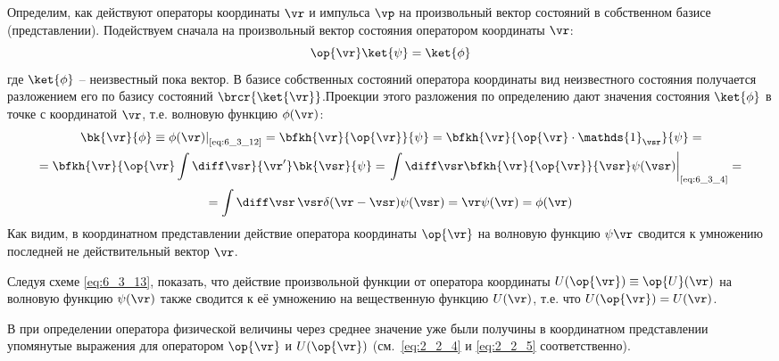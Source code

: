 Определим, как действуют операторы координаты $\vr$ и импульса $\vp$ на произвольный вектор состояний в собственном базисе (представлении). Подействуем сначала на произвольный вектор состояния оператором координаты $\vr$:%
%
\begin{equation}
\label{eq:6_3_12}
\op{\vr} \ket{\psi} = \ket{\phi}
\end{equation}%
%
где $\ket{\phi}$ -- неизвестный пока вектор. В базисе собственных состояний оператора координаты вид неизвестного состояния получается разложением его по базису состояний $\brcr{\ket{\vr}}$.Проекции этого разложения по определению дают значения состояния $\ket{\phi}$ в точке с координатой $\vr$, т.е. волновую функцию $\phi(\vr)$:%
%
\begin{equation}
\label{eq:6_3_13}
\begin{gathered}
	\left.\bk{\vr}{\phi} \equiv \phi(\vr)\right|_{\text{\eqref{eq:6_3_12}}} =
	\bfkh{\vr}{\op{\vr}}{\psi} = 
	\bfkh{\vr}{\op{\vr} \cdot \mathds{1}_{\vsr}}{\psi} = \\ =
	\bfkh{\vr}{\op{\vr}\int \diff\vsr}{\vr'} \bk{\vsr}{\psi} =
	\left.\int \diff\vsr \bfkh{\vr}{\op{\vr}}{\vsr} \psi(\vsr) \right|_{\text{\eqref{eq:6_3_4}}} = \\ =
 	\int \diff\vsr \, \vsr \delta(\vr - \vsr) \psi(\vsr) = \vr \psi(\vr) = \phi(\vr)
\end{gathered}
\end{equation}%
%
Как видим, в координатном представлении действие оператора координаты $\op{\vr}$ на волновую функцию $\psi{\vr}$ сводится к умножению последней не действительный вектор $\vr$.%
%
\begin{excr}
Следуя схеме \eqref{eq:6_3_13}, показать, что действие произвольной функции от оператора координаты $U(\op{\vr}) \equiv \op{U}(\vr)$ на волновую функцию $\psi(\vr)$ также сводится к её умножению на вещественную функцию $U(\vr)$, т.е. что $U(\op{\vr})=U(\vr)$.
\end{excr}%
%
В  при определении оператора физической величины через среднее значение уже были получины в координатном представлении упомянутые выражения для оператором $\op{\vr}$ и $U(\op{\vr})$ (см.~\eqref{eq:2_2_4} и \eqref{eq:2_2_5} соответственно).

